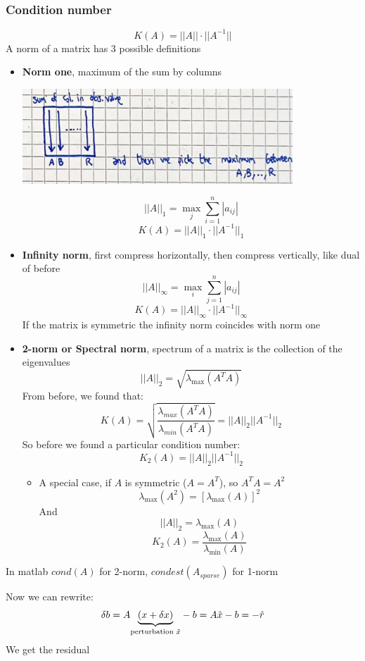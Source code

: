 \subsubsection{Condition number}
$$
K(A)=||A||\cdot||A^{-1}||
$$
A norm of a matrix has 3 possible definitions
\begin{itemize}
    \item \textbf{Norm one}, maximum of the sum by columns
    \begin{center}
        \includegraphics[width=0.8\textwidth]{images/normone.png}
    \end{center}
    $$||A||_1=\max_j\sum_{i=1}^n|a_{ij}|$$
    $$K(A)=||A||_1\cdot||A^{-1}||_1$$
    \item \textbf{Infinity norm}, first compress horizontally, then compress vertically, like dual of before
    $$||A||_\infty=\max_i\sum_{j=1}^n|a_{ij}|$$
    $$K(A)=||A||_\infty\cdot||A^{-1}||_\infty$$
    If the matrix is symmetric the infinity norm coincides with norm one
    \item \textbf{2-norm or Spectral norm}, spectrum of a matrix is the collection of the eigenvalues
    $$
    ||A||_2=\sqrt{\lambda_{\max}(A^TA)}
    $$
    From before, we found that:
    $$
    K(A)=\sqrt{\frac{
        \lambda_{max}(A^TA)
    }{\lambda_{min}(A^TA)}}=||A||_2||A^{-1}||_2
    $$
    So before we found a particular condition number:
    $$K_2(A)=||A||_2||A^{-1}||_2$$
    \begin{itemize}
        \item A special case, if $A$ is symmetric ($A=A^T$), so $A^TA=A^2$
        $$
        \lambda_{\max}(A^2)=[\lambda_{\max}(A)]^2
        $$
        And
        $$
        ||A||_2=\lambda_{\max}(A)
        $$
        $$
        K_2(A)=\frac{\lambda_{\max}(A)}{\lambda_{\min}(A)}
        $$
    \end{itemize}
\end{itemize}
In matlab $cond(A)$ for 2-norm, $condest(A_{sparse})$ for 1-norm

Now we can rewrite:
$$
\delta b = A\underlabel{(x+\delta x)}{perturbation $\tilde{x}$}-b=A\tilde{x}-b=-\tilde{r}
$$
We get the residual

